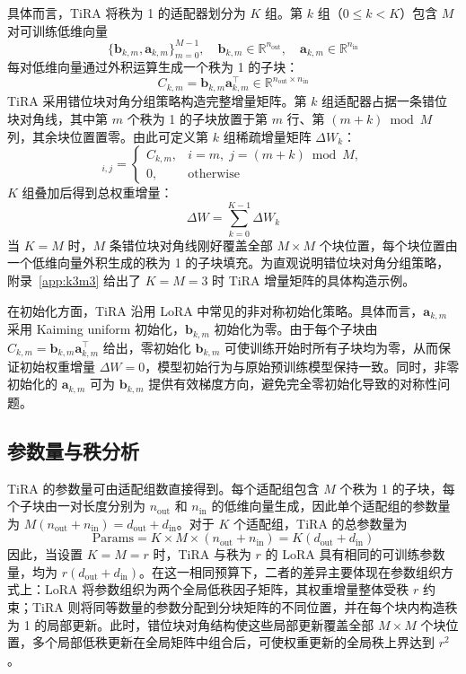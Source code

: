 ﻿\documentclass[UTF8,a4paper,11pt]{ctexart}
\newcommand{\R}{\mathbb{R}}
\newcommand{\DeltaW}{\Delta W}
\begin{document}
具体而言，TiRA 将秩为 1 的适配器划分为 $K$ 组。第 $k$ 组（$0\leq k<K$）包含 $M$ 对可训练低维向量
\begin{equation}
    \{\bm{b}_{k,m},\bm{a}_{k,m}\}_{m=0}^{M-1},\quad
    \bm{b}_{k,m}\in\R^{n_{\mathrm{out}}},\quad
    \bm{a}_{k,m}\in\R^{n_{\mathrm{in}}}
\end{equation}
每对低维向量通过外积运算生成一个秩为 1 的子块：
\begin{equation}
    C_{k,m}=\bm{b}_{k,m}\bm{a}_{k,m}^{\top}\in\R^{n_{\mathrm{out}}\times n_{\mathrm{in}}}
\end{equation}
TiRA 采用错位块对角分组策略构造完整增量矩阵。第 $k$ 组适配器占据一条错位块对角线，其中第 $m$ 个秩为 1 的子块放置于第 $m$ 行、第 $(m+k)\bmod M$ 列，其余块位置置零。由此可定义第 $k$ 组稀疏增量矩阵 $\Delta W_k$：
\begin{equation}
    [\Delta W_k]_{i,j}=
    \begin{cases}
        C_{k,m}, & i=m,\; j=(m+k)\bmod M,\\
        0, & \text{otherwise}
    \end{cases}
\end{equation}
$K$ 组叠加后得到总权重增量：
\begin{equation}
    \DeltaW = \sum_{k=0}^{K-1}\Delta W_k
\end{equation}
当 $K=M$ 时，$M$ 条错位块对角线刚好覆盖全部 $M\times M$ 个块位置，每个块位置由一个低维向量外积生成的秩为 1 的子块填充。为直观说明错位块对角分组策略，附录~\ref{app:k3m3} 给出了 $K=M=3$ 时 TiRA 增量矩阵的具体构造示例。

在初始化方面，TiRA 沿用 LoRA 中常见的非对称初始化策略。具体而言，$\bm{a}_{k,m}$ 采用 Kaiming uniform 初始化\cite{he2015rectifier}，$\bm{b}_{k,m}$ 初始化为零。由于每个子块由 $C_{k,m}=\bm{b}_{k,m}\bm{a}_{k,m}^{\top}$ 给出，零初始化 $\bm{b}_{k,m}$ 可使训练开始时所有子块均为零，从而保证初始权重增量 $\DeltaW=0$，模型初始行为与原始预训练模型保持一致。同时，非零初始化的 $\bm{a}_{k,m}$ 可为 $\bm{b}_{k,m}$ 提供有效梯度方向，避免完全零初始化导致的对称性问题。

\subsection{参数量与秩分析}

TiRA 的参数量可由适配组数直接得到。每个适配组包含 $M$ 个秩为 1 的子块，每个子块由一对长度分别为 $n_{\mathrm{out}}$ 和 $n_{\mathrm{in}}$ 的低维向量生成，因此单个适配组的参数量为 $M(n_{\mathrm{out}}+n_{\mathrm{in}})=d_{\mathrm{out}}+d_{\mathrm{in}}$。对于 $K$ 个适配组，TiRA 的总参数量为
\begin{equation}
    \mathrm{Params}=K\times M\times(n_{\mathrm{out}}+n_{\mathrm{in}})=K(d_{\mathrm{out}}+d_{\mathrm{in}})
\end{equation}
因此，当设置 $K=M=r$ 时，TiRA 与秩为 $r$ 的 LoRA 具有相同的可训练参数量，均为 $r(d_{\mathrm{out}}+d_{\mathrm{in}})$。在这一相同预算下，二者的差异主要体现在参数组织方式上：LoRA 将参数组织为两个全局低秩因子矩阵，其权重增量整体受秩 $r$ 约束；TiRA 则将同等数量的参数分配到分块矩阵的不同位置，并在每个块内构造秩为 1 的局部更新。此时，错位块对角结构使这些局部更新覆盖全部 $M\times M$ 个块位置，多个局部低秩更新在全局矩阵中组合后，可使权重更新的全局秩上界达到 $r^2$。
\end{document}

